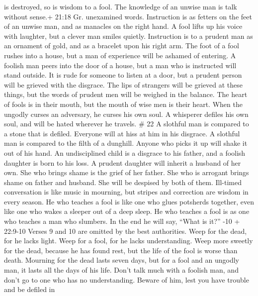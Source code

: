 is destroyed, so is wisdom to a fool. The knowledge of an unwise man is
talk without sense.+ 21:18 Gr. unexamined words. 
Instruction is as fetters on the feet of an unwise man, and as manacles
on the right hand.  A fool lifts up his voice with
laughter, but a clever man smiles quietly.  Instruction is
to a prudent man as an ornament of gold, and as a bracelet upon his
right arm.  The foot of a fool rushes into a house, but a
man of experience will be ashamed of entering.  A foolish
man peers into the door of a house, but a man who is instructed will
stand outside.  It is rude for someone to listen at a door,
but a prudent person will be grieved with the disgrace. 
The lips of strangers will be grieved at these things, but the words of
prudent men will be weighed in the balance.  The heart of
fools is in their mouth, but the mouth of wise men is their heart.
 When the ungodly curses an adversary, he curses his own
soul.  A whisperer defiles his own soul, and will be hated
wherever he travels. \# 22  A slothful man is compared to a
stone that is defiled. Everyone will at hiss at him in his disgrace.
 A slothful man is compared to the filth of a dunghill.
Anyone who picks it up will shake it out of his hand.  An
undisciplined child is a disgrace to his father, and a foolish daughter
is born to his loss.  A prudent daughter will inherit a
husband of her own. She who brings shame is the grief of her father.
 She who is arrogant brings shame on father and husband. She
will be despised by both of them.  Ill-timed conversation is
like music in mourning, but stripes and correction are wisdom in every
season.  He who teaches a fool is like one who glues
potsherds together, even like one who wakes a sleeper out of a deep
sleep.  He who teaches a fool is as one who teaches a man
who slumbers. In the end he will say, ``What is it?'' -10 +
22:9-10 Verses 9 and 10 are omitted by the best authorities.
 Weep for the dead, for he lacks light. Weep for a fool,
for he lacks understanding. Weep more sweetly for the dead, because he
has found rest, but the life of the fool is worse than death.
 Mourning for the dead lasts seven days, but for a fool and
an ungodly man, it lasts all the days of his life.  Don't
talk much with a foolish man, and don't go to one who has no
understanding. Beware of him, lest you have trouble and be defiled in
